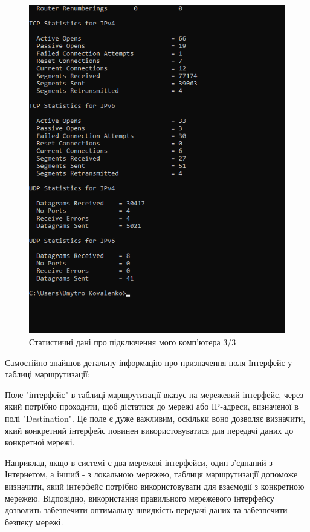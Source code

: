 \documentclass{article}
\begin{document}
\begin{normalsize}
\begin{figure}[H]
	\centering
	\includegraphics[width=\textwidth]{53}
	\caption{Статистичні дані про підключення
		мого комп'ютера 3/3}
\end{figure}

Самостійно знайшов детальну інформацію про призначення поля Інтерфейс у таблиці маршрутизації:

Поле "інтерфейс" в таблиці маршрутизації вказує на мережевий інтерфейс, через який потрібно проходити, щоб дістатися до мережі або IP-адреси, визначеної в полі "Destination". Це поле є дуже важливим, оскільки воно дозволяє визначити, який конкретний інтерфейс повинен використовуватися для передачі даних до конкретної мережі.

Наприклад, якщо в системі є два мережеві інтерфейси, один з'єднаний з Інтернетом, а інший - з локальною мережею, таблиця маршрутизації допоможе визначити, який інтерфейс потрібно використовувати для взаємодії з конкретною мережею. Відповідно, використання правильного мережевого інтерфейсу дозволить забезпечити оптимальну швидкість передачі даних та забезпечити безпеку мережі.


\end{normalsize}
\end{document}

